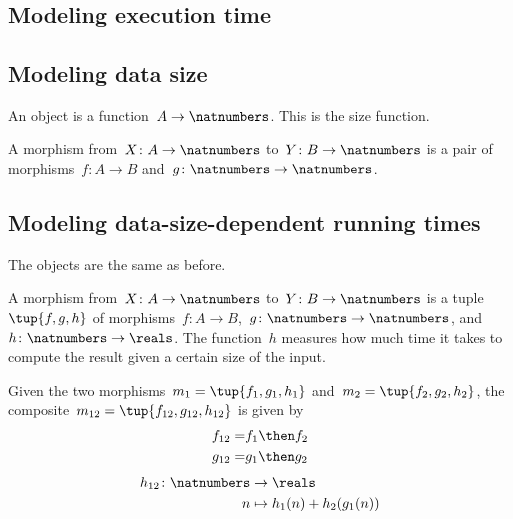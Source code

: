 

\section{}



\subsection{Modeling execution time}


\subsection{Modeling data size}

An object is a function~$A \to \natnumbers $. This is the size function.

A morphism from~$X\colon A \to \natnumbers$ to~$Y\colon B \to \natnumbers$ is a pair of morphisms~$f\colon A \to B$ and~$g\colon \natnumbers \to \natnumbers$.


\subsection{Modeling data-size-dependent running times}

The objects are the same as before.

A morphism from~$X\colon A \to \natnumbers$ to~$Y\colon B \to \natnumbers$ is a tuple~$\tup{f, g, h}$ of morphisms~$f\colon A \to B$,~$g\colon \natnumbers \to \natnumbers$, and~$h\colon \natnumbers \to \reals$.
The function~$h$ measures how much time it takes to compute the result given a certain size of the input.

Given the two morphisms~$m_1 = \tup{f_1, g_1, h_1}$ and~$m_2 = \tup{f_2, g_2, h_2}$, the composite~$m_{12} = \tup{f_{12}, g_{12}, h_{12}}$ is given by
%
\begin{eqnarray}
  f_{12} =& f_1 \then f_2 \\
  g_{12} =& g_1 \then g_2 \\
\end{eqnarray}
%
\begin{eqnarray}
  h_{12} \colon \natnumbers & \to \reals \\
  n & \mapsto h_1(n) + h_2( g_1 (n))
\end{eqnarray}
